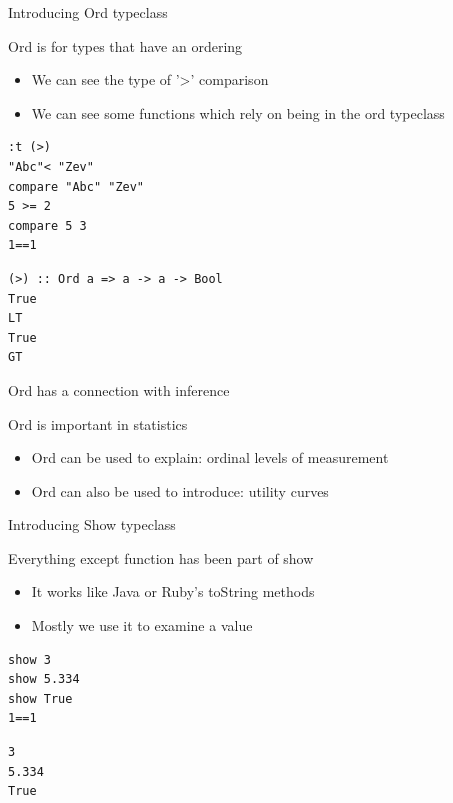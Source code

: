 \documentclass[presetation]{beamer}
\begin{document}
\begin{frame}[fragile,label={sec:org3cad51b}]{Introducing Ord typeclass}
 \begin{block}{Ord is for types that have an ordering}
\begin{itemize}
\item We can see the type of '>' comparison
\item We can see some functions which rely on being in the ord typeclass
\end{itemize}
\begin{verbatim}
:t (>)
"Abc"< "Zev"
compare "Abc" "Zev"
5 >= 2
compare 5 3
1==1
\end{verbatim}

\begin{verbatim}
(>) :: Ord a => a -> a -> Bool
True
LT
True
GT
\end{verbatim}
\end{block}
\end{frame}


\begin{frame}[label={sec:org43cf92d}]{Ord has a connection with inference}
\begin{block}{Ord is important in statistics}
\begin{itemize}
\item Ord can be used to explain: \alert{ordinal levels of measurement}
\end{itemize}
\pause
\begin{itemize}
\item Ord can also be used to introduce: \alert{utility curves}
\end{itemize}
\end{block}
\end{frame}


\begin{frame}[fragile,label={sec:org29b26b6}]{Introducing Show typeclass}
 \begin{block}{Everything except function has been part of show}
\begin{itemize}
\item It works like Java or Ruby's toString methods
\item Mostly we use it to examine a value
\end{itemize}
\begin{verbatim}
show 3
show 5.334
show True
1==1
\end{verbatim}

\begin{verbatim}
3
5.334
True
\end{verbatim}
\end{block}
\end{frame}
\end{document}
